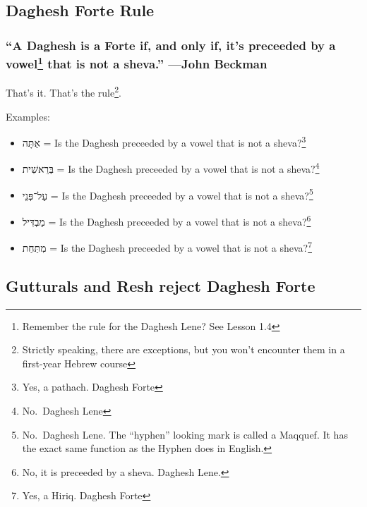 \documentclass[
]{turabian-researchpaper}
\providecommand{\tightlist}{%
  \setlength{\itemsep}{0pt}\setlength{\parskip}{0pt}}
\begin{document}
\hypertarget{two_6}{%
\subsection{Daghesh Forte Rule}\label{two_6}}

\hypertarget{a-daghesh-is-a-forte-if-and-only-if-its-preceeded-by-a-vowel-that-is-not-a-sheva.-john-beckman}{%
\subsubsection*{\texorpdfstring{``A Daghesh is a Forte if, and only if, it's preceeded by a vowel\footnote{Remember the rule for the Daghesh Lene? See Lesson 1.4} that is not a sheva.'' ---John Beckman}{``A Daghesh is a Forte if, and only if, it's preceeded by a vowel that is not a sheva.'' ---John Beckman}}\label{a-daghesh-is-a-forte-if-and-only-if-its-preceeded-by-a-vowel-that-is-not-a-sheva.-john-beckman}}

That's it. That's the rule\footnote{Strictly speaking, there are exceptions, but you won't encounter them in a first-year Hebrew course}.

Examples:

\begin{itemize}
\tightlist
\item
  אַתָּה = Is the Daghesh preceeded by a vowel that is not a sheva?\footnote{Yes, a pathach. Daghesh Forte}
\item
  בְּרֵאשִׁית = Is the Daghesh preceeded by a vowel that is not a sheva?\footnote{No.~Daghesh Lene}
\item
  עַל־פְּנֵי = Is the Daghesh preceeded by a vowel that is not a sheva?\footnote{No.~Daghesh Lene. The ``hyphen'' looking mark is called a Maqquef. It has the exact same function as the Hyphen does in English.}
\item
  מַבְדִּיל = Is the Daghesh preceeded by a vowel that is not a sheva?\footnote{No, it is preceeded by a sheva. Daghesh Lene.}
\item
  מִתַּחַת = Is the Daghesh preceeded by a vowel that is not a sheva?\footnote{Yes, a Hiriq. Daghesh Forte}
\end{itemize}

\hypertarget{two_7}{%
\subsection{Gutturals and Resh reject Daghesh Forte}\label{two_7}}
\end{document}
